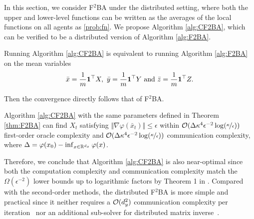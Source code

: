 \documentclass{article}
\begin{document}
In this section, we consider F${}^2$BA under the distributed setting, where both the upper and lower-level functions can be written as the averages of the local functions on all agents as \eqref{prob:fn}. 
We propose Algorithm \ref{alg:CF2BA}, which can be verified to be a distributed version of Algorithm \ref{alg:F2BA}.
\begin{prop} 
Running Algorithm \ref{alg:CF2BA} is equivalent to running  Algorithm \ref{alg:F2BA}  on the mean variables
\begin{align*}
    \bar x = \frac{1}{m} {\bf{1}}^\top X,~ \bar y = \frac{1}{m} {\bf{1}}^\top Y ~{\rm and}~ \bar z = \frac{1}{m} {\bf{1}}^\top Z.
\end{align*}
\end{prop}
Then the convergence directly follows that of F${}^2$BA. 
\begin{cor} \label{cor:CF2BA}
Algorithm \ref{alg:CF2BA} with the same parameters defined in Theorem \ref{thm:F2BA} can find  $X_t$ satisfying $ \Vert \nabla \varphi(\bar x_t) \Vert \le \epsilon $ within ${\mathcal{O}}(\Delta \kappa^4 \epsilon^{-2} \log(\nicefrac{\kappa}{\epsilon})) $ first-order oracle complexity and  ${\mathcal{O}}( \Delta \kappa^4 \epsilon^{-2} \log(\nicefrac{\kappa}{\epsilon})) $ communication complexity, where $\Delta = \varphi(x_0) - \inf_{x \in {\mathbb{R}}^{d_x}} \varphi(x)$.
\end{cor}

Therefore, we conclude that Algorithm \ref{alg:CF2BA} is also near-optimal since both the computation complexity and communication complexity match the $\Omega(\epsilon^{-2})$ lower bounds up to logarithmic factors by Theorem 1 in \cite{lu2021optimal}.
Compared with the second-order methods, the distributed F${}^2$BA is more
simple and practical since it
neither requires a ${\mathcal{O}}(d_y^2)$ communication complexity per iteration~\cite{yangdecentralized} nor an additional sub-solver for distributed matrix inverse~\cite{tarzanagh2022fednest,chen2022decentralized}. 
\end{document}
